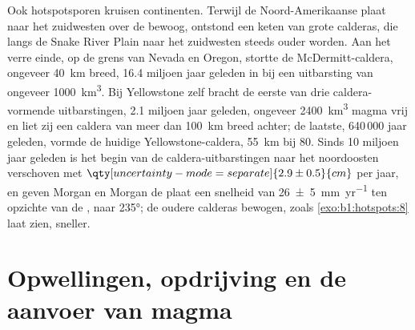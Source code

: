 \begin{omfigure}
\par{}
\label{fig:b1:hotspots:map}
\end{omfigure}


Ook hotspotsporen kruisen continenten. Terwijl de Noord-Amerikaanse plaat naar het zuidwesten over de  bewoog, ontstond een keten van grote calderas, die langs de Snake River Plain naar het zuidwesten steeds ouder worden. Aan het verre einde, op de grens van Nevada en Oregon, stortte de McDermitt-caldera, ongeveer \qty{40}{km} breed, 16.4 miljoen jaar geleden in bij een uitbarsting van ongeveer \qty{1000}{km^3}. Bij Yellowstone zelf bracht de eerste van drie caldera-vormende uitbarstingen, 2.1 miljoen jaar geleden, ongeveer \qty{2400}{km^3} magma vrij en liet zij een caldera van meer dan \qty{100}{km} breed achter; de laatste, 640\,000 jaar geleden, vormde de huidige Yellowstone-caldera, \qty{55}{km} bij 80. Sinds 10 miljoen jaar geleden is het begin van de caldera-uitbarstingen naar het noordoosten verschoven met $\qty[uncertainty-mode=separate]{2.9 \pm 0.5}{cm}$ per jaar, en geven Morgan en Morgan de plaat een snelheid van \qty[uncertainty-mode=separate]{26 \pm 5}{mm.yr^{-1}} ten opzichte van de , naar \ang{235}; de oudere calderas bewogen, zoals \cref{exo:b1:hotspots:8} laat zien, sneller.

\section{Opwellingen, opdrijving en de aanvoer van magma}\label{sec:b1:hotspots:swells}

